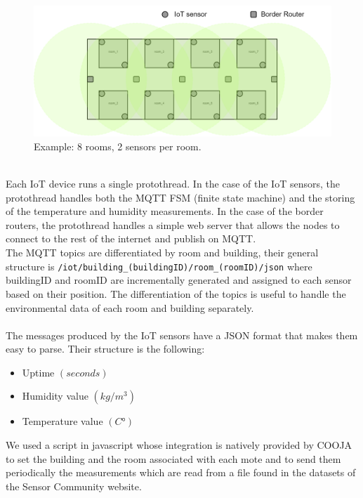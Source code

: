 \documentclass{article}
\begin{document}
\begin{figure}[htp]
	\centering
	\includegraphics[width=\linewidth]{resources/building_example_1.drawio.png}
	\caption{Example: 8 rooms, 2 sensors per room.}
	\label{fig:client_server_diag}
\end{figure}
\clearpage
\\
Each IoT device runs a single protothread. In the case of the IoT sensors, the protothread handles both the MQTT FSM (finite state machine) and the storing of the temperature and humidity measurements. In the case of the border routers, the protothread handles a simple web server that allows the nodes to connect to the rest of the internet and publish on MQTT.
\\
The MQTT topics are differentiated by room and building, their general structure is \texttt{/iot/building\_(buildingID)/room\_(roomID)/json} where buildingID and roomID are incrementally generated and assigned to each sensor based on their position. The differentiation of the topics is useful to handle the environmental data of each room and building separately.
\\
\\
The messages produced by the IoT sensors have a JSON format that makes them easy to parse. Their structure is the following:

\begin{itemize}
    \item Uptime $(seconds)$
    \item Humidity value $(kg/m^3)$
    \item Temperature value $(C°)$
\end{itemize}
We used a script in javascript whose integration is natively provided by COOJA to set the building and the room associated with each mote and to send them periodically the measurements which are read from a file found in the datasets of the Sensor Community website.
\end{document}
